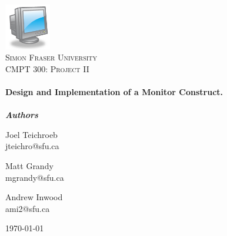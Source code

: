 \begin{titlepage}

\begin{center}


\includegraphics[width=0.15\textwidth]{./logo}\\[1cm]    

\textsc{\LARGE Simon Fraser University}\\[1.5cm]

\textsc{\Large CMPT 300: Project II}\\[0.5cm]


\HRule \\[0.4cm]
{ \huge \bfseries Design and Implementation of a Monitor Construct. }\\[0.4cm]

\HRule \\[1.5cm]
{ \large \bfseries \emph{Authors}}\\[1cm]

\begin{minipage}{0.26\textwidth}
\begin{flushleft} \large
Joel Teichroeb\\
jteichro@sfu.ca
\end{flushleft}
\end{minipage}
\begin{minipage}{0.26\textwidth}
\centering
\large
Matt Grandy\\
mgrandy@sfu.ca
\end{minipage}
\begin{minipage}{0.26\textwidth}
\begin{flushright} \large
Andrew Inwood\\
ami2@sfu.ca
\end{flushright}
\end{minipage}

\vfill

{\large \today}

\end{center}

\end{titlepage}
